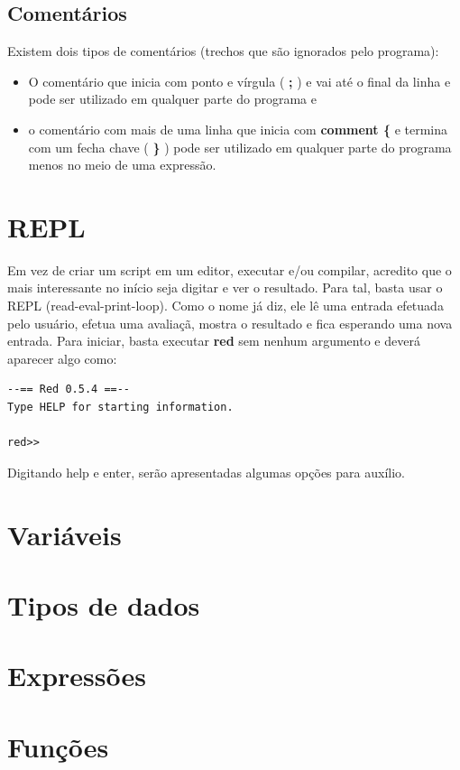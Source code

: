 \documentclass[12pt]{article}
\begin{document}
\subsection{Comentários}
Existem dois tipos de comentários (trechos que são ignorados pelo programa): 
\begin{itemize}
\item O comentário que inicia com ponto e vírgula ( \textbf{;} ) e vai até o
  final da linha e pode ser utilizado em qualquer parte do programa e
\item o comentário com mais de uma linha que inicia com \textbf{comment \{} e
  termina com um fecha chave ( \textbf{\}} ) pode ser utilizado em qualquer
  parte do programa menos no meio de uma expressão.
\end{itemize}

\section{REPL}
Em vez de criar um script em um editor, executar e/ou compilar, acredito que o 
mais interessante no início seja digitar e ver o resultado. Para tal, basta usar
o REPL (read-eval-print-loop). Como o nome já diz, ele lê uma entrada efetuada
pelo usuário, efetua uma avaliaçã, mostra o resultado e fica esperando uma nova
entrada. Para iniciar, basta executar \textbf{red} sem nenhum argumento e deverá
aparecer algo como:

\begin{shaded}
\begin{verbatim}
--== Red 0.5.4 ==-- 
Type HELP for starting information. 

red>>
\end{verbatim}
\end{shaded}

Digitando help e enter, serão apresentadas algumas opções para auxílio.

\section{Variáveis}
\section{Tipos de dados}
\section{Expressões}
\section{Funções}
\end{document}
